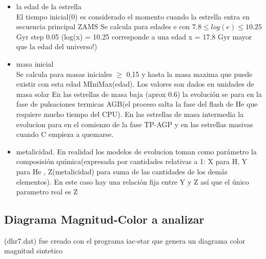 \documentclass[10pt]{book}
\begin{document}
\begin{itemize}
	\item la edad de la estrella\\
	El tiempo inicial(0) es considerado el momento cuando la estrella entra en secuencia principal ZAMS
	Se calcula para edades e con $7.8 \le log(e) \le 10.25$ Gyr step 0.05  (log(x) = 10.25 corresponde a una edad x = 17.8 Gyr mayor que la edad del universo!)

	\item masa inicial\\
	Se calcula para masas iniciales $\ge$ 0.15 y hasta la masa maxima que puede existir con esta edad MIniMax(edad). Los valores son dados en unidades de masa solar
	En las estrellas de masa baja (aprox 0.6)  la evolución se para en la fase de pulsaciones termicas AGB(el proceso salta la fase del flash de He que requiere mucho tiempo del CPU). En las estrellas de masa intermedia la evolucion para en el comienzo de  la fase TP-AGP y en las estrellas masivas cuando C empieza a quemarse.

	\item metalicidad. En realidad los modelos de evolucion toman como parámetro la composisión química(expresada por cantidades relativas a 1: X para H, Y para He , Z(metalicidad) para suma de las cantidades de los demás elementos). En este caso hay una relación fija entre Y y Z así que el único parametro real es Z
\end{itemize}



\subsection*{Diagrama Magnitud-Color a analizar}

(dhr7.dat) fue creado con el programa iac-star que genera un diagrama color magnitud sintetico \\
\end{document}

